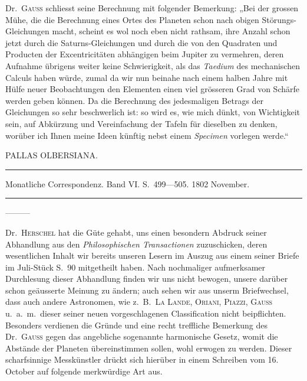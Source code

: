 Dr.\ \textsc{Gauss} schliesst seine Berechnung mit folgender Bemerkung: „Bei der grossen Mühe, die die Berechnung eines Ortes des Planeten schon nach obigen Störungs-Gleichungen macht, scheint es wol noch eben nicht rathsam, ihre Anzahl schon jetzt durch die Saturns-Gleichungen und durch die von den Quadraten und Producten der Excentricitäten abhängigen beim Jupiter zu vermehren, deren Aufnahme übrigens weiter keine Schwierigkeit, als das \textit{Taedium} des mechanischen Calculs haben würde, zumal da wir nun beinahe nach einem halben Jahre mit Hülfe neuer Beobachtungen den Elementen einen viel grösseren Grad von Schärfe werden geben können. Da die Berechnung des jedesmaligen Betrags der Gleichungen so sehr beschwerlich ist: so wird es, wie mich dünkt, von Wichtigkeit sein, auf Abkürzung und Vereinfachung der Tafeln für dieselben zu denken, worüber ich Ihnen meine Ideen künftig nebst einem \textit{Specimen} vorlegen werde.“
\begin{flushright}\end{flushright}

\bigskip{}
\begin{center}
PALLAS OLBERSIANA.\par
\medskip\hrule\medskip
Monatliche Correspondenz. Band VI. S.\ 499—505. 1802 November.\par
\medskip\hrule
\end{center}\medskip
—\quad —\quad —

Dr.\ \textsc{Herschel} hat die Güte gehabt, uns einen besondern Abdruck seiner Abhandlung aus den \textit{Philosophischen Transactionen} zuzuschicken, deren wesentlichen Inhalt wir bereits unseren Lesern im Auszug aus einem seiner Briefe im Juli-Stück S.\ 90 mitgetheilt haben. Nach nochmaliger aufmerksamer Durchlesung dieser Abhandlung finden wir uns nicht bewogen, unsere darüber schon geäusserte Meinung zu ändern; auch sehen wir aus unserm Briefwechsel, dass auch andere Astronomen, wie z.\ B.\ \textsc{La Lande}, \textsc{Oriani}, \textsc{Piazzi}, \textsc{Gauss} u.\ a.\ m.\ dieser seiner neuen vorgeschlagenen Classification nicht beipflichten. Besonders verdienen die Gründe und eine recht treffliche Bemerkung des Dr.\ \textsc{Gauss} gegen das angebliche sogenannte harmonische Gesetz, womit die Abstände der Planeten übereinstimmen sollen, wohl erwogen zu werden. Dieser scharfsinnige Messkünstler drückt sich hierüber in einem Schreiben vom 16. October auf folgende merkwürdige Art aus.

